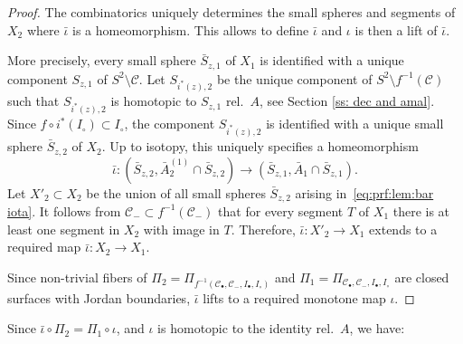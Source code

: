 \documentclass{amsart}
\theoremstyle{plain}
\theoremstyle{definition}
\theoremstyle{remark}
\newcommand{\reminder}[1]{\textsl{$\lhd\rhd$#1$\lhd\rhd$}\marginpar{$\lhd\rhd\lhd\rhd\lhd\rhd$}}%
\newcommand{\hide}[1]{}
\newcommand{\CC}{{\mathcal C}}
\begin{document}
\begin{proof}
The combinatorics uniquely determines the small spheres and segments of $X_2$ where $\bar \iota$ is a homeomorphism. This allows to define $\bar \iota$ and $\iota$ is then a lift of $\bar\iota$. 

More precisely, every small sphere $ \bar S_{z,1}$ of $X_1$ is identified with a unique component $S_{z,1}$ of $S^2\setminus \CC$.
Let $S_{i^*(z),2}$ be the unique component of $S^2\setminus f^{-1}(\CC)$ such that $S_{i^*(z),2}$ is homotopic to $S_{z,1}$ rel.\ $A$, see Section \ref{ss: dec and amal}.
Since $f\circ i^* (I_\circ)\subset I_\circ$, the component $S_{i^*(z),2}$ is identified with a unique small sphere $\bar S_{z,2}$ of $X_2$. Up to isotopy, this uniquely specifies a homeomorphism 
\begin{equation}
\label{eq:prf:lem:bar iota}
\bar \iota \colon (\bar S_{z,2},\bar A^{(1)}_2\cap \bar S_{z,2}) \to (\bar S_{z,1},\bar A_1\cap \bar S_{z,1}).
\end{equation}
Let $X'_2\subset X_2$ be the union of all small spheres $\bar S_{z,2}$ arising in~\eqref{eq:prf:lem:bar iota}. It follows from $\CC_-\subset  f^{-1}(\CC_-)$ that for every segment $T$ of $X_1$ there is at least one segment in $X_2$ with image in $T$. Therefore, $\bar \iota \colon X'_2\to X_1$ extends to a required map $\bar \iota \colon X_2\to X_1$.


Since non-trivial fibers of $\Pi_2=\Pi_{f^{-1}(\CC_\bullet, \CC_- , I_\bullet , I_\circ)} $ and $\Pi_1=\Pi_{ \CC_\bullet, \CC_- , I_\bullet , I_\circ }$
are closed surfaces with Jordan boundaries, $\bar \iota$ lifts to a required monotone map $\iota$. %
\end{proof}

Since $\bar \iota \circ  \Pi_2=\Pi_1\circ \iota $, and $\iota$ is homotopic to the identity rel.\ $A$, we have:
\end{document}
